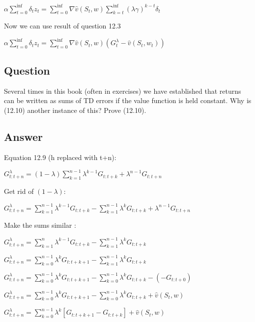 \documentclass[11pt]{article}
\begin{document}
    \noindent $  \alpha \sum_{t=0}^{\inf} \delta_t z_t =  \sum_{t=0}^{\inf} \nabla\hat{v}(S_t, w) \sum_{k=t}^{\inf} (\lambda \gamma)^{k-t} \delta_{t} $


    \hfill \break
    \noindent Now we can use result of question 12.3

    \noindent $  \alpha \sum_{t=0}^{\inf} \delta_t z_t =  \sum_{t=0}^{\inf} \nabla\hat{v}(S_t, w) (G_{t}^{\lambda} - \hat{v}(S_t, w_t)) $


    \subsection{Question}

    Several times in this book (often in exercises) we have established that returns can be written as sums of TD errors if the value function is held constant.
    Why is (12.10) another instance of this?
    Prove (12.10).

    \subsection*{Answer}

    \noindent Equation 12.9 (h replaced with t+n):

    \noindent $ G_{t:t+n}^{\lambda} = (1-\lambda) \sum_{k=1}^{n-1} \lambda^{k-1} G_{t:t+k} + \lambda^{n-1} G_{t:t+n} $

    \hfill \break
    \noindent Get rid of $ (1- \lambda) $:

    \noindent $ G_{t:t+n}^{\lambda} = \sum_{k=1}^{n-1} \lambda^{k-1} G_{t:t+k} - \sum_{k=1}^{n-1} \lambda^k G_{t:t+k} + \lambda^{n-1} G_{t:t+n} $

    \hfill \break
    \noindent Make the sums similar :

    \noindent $ G_{t:t+n}^{\lambda} = \sum_{k=1}^{n} \lambda^{k-1} G_{t:t+k} - \sum_{k=1}^{n-1} \lambda^k G_{t:t+k} $

    \noindent $ G_{t:t+n}^{\lambda} = \sum_{k=0}^{n-1} \lambda^{k} G_{t:t+k+1} - \sum_{k=1}^{n-1} \lambda^k G_{t:t+k} $

    \noindent $ G_{t:t+n}^{\lambda} = \sum_{k=0}^{n-1} \lambda^{k} G_{t:t+k+1} - \sum_{k=0}^{n-1} \lambda^k G_{t:t+k} - ( - G_{t:t+0} ) $

    \noindent $ G_{t:t+n}^{\lambda} = \sum_{k=0}^{n-1} \lambda^{k} G_{t:t+k+1} - \sum_{k=0}^{n-1} \lambda^k G_{t:t+k} + \hat{v}(S_t, w) $

    \noindent $ G_{t:t+n}^{\lambda} = \sum_{k=0}^{n-1} \lambda^{k} [G_{t:t+k+1} - G_{t:t+k}] + \hat{v}(S_t, w) $
\end{document}
